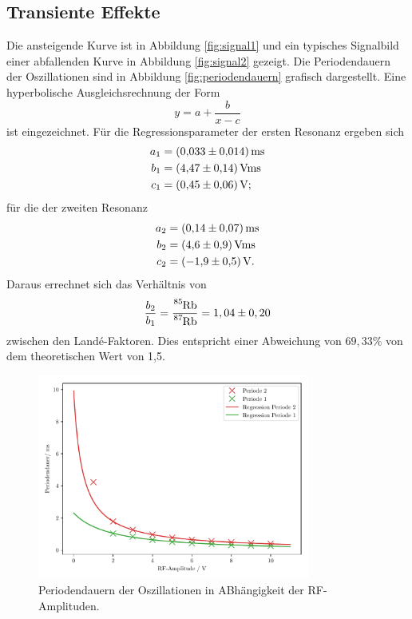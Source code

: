 \subsection{Transiente Effekte}
Die ansteigende Kurve ist in Abbildung \ref{fig:signal1} und ein typisches Signalbild einer abfallenden Kurve in Abbildung \ref{fig:signal2} gezeigt. Die Periodendauern der Oszillationen sind in Abbildung \ref{fig:periodendauern} grafisch dargestellt.
Eine hyperbolische Ausgleichsrechnung der Form
\begin{equation}
  y=a+\frac{b}{x-c}
\end{equation}
ist eingezeichnet.
Für die Regressionsparameter der ersten Resonanz ergeben sich
\begin{align*}
  a_1&= \SI{0,033 \pm 0,014}{ms}\\
  b_1&= \SI{4,47 \pm 0,14}{V ms}\\
  c_1&= \SI{0,45 \pm 0,06}{V};
\end{align*}
für die der zweiten Resonanz
\begin{align*}
  a_2&= \SI{0,14 \pm 0,07}{ms}\\
  b_2&= \SI{4,6 \pm 0,9}{V ms}\\
  c_2&= \SI{-1,9 \pm 0,5}{V}.
\end{align*}
Daraus errechnet sich das Verhältnis von
\begin{equation*}
\frac{b_2}{b_1}=\frac{\ce{^{85}Rb}}{\ce{^{87}Rb}}=1,04 \pm 0,20
\end{equation*}
zwischen den Landé-Faktoren.
Dies entspricht einer Abweichung von $69,33\%$ von dem theoretischen Wert von 1,5\cite{anleitung}.
\begin{figure}[H]
  \centering
  \includegraphics[width=0.8\textwidth]{Berechnung/perioden.pdf}
  \caption{Periodendauern der Oszillationen in ABhängigkeit der RF-Amplituden.}
  \label{fig:resonanz}
\end{figure}
